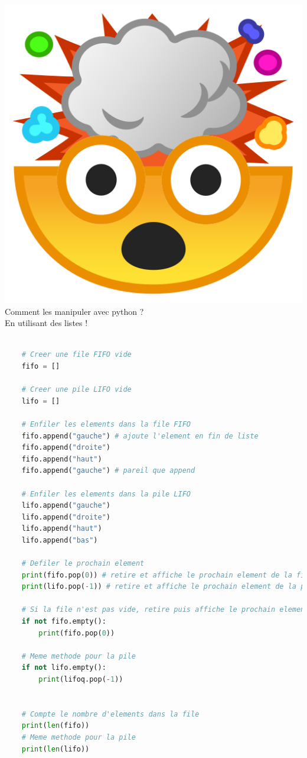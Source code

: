 \documentclass{report}
\begin{document}
\includegraphics[scale=0.03]{mindblow}{\selectfont
Comment les manipuler avec python ?
}\\[0.5cm]
En utilisant des listes !
\begin{lstlisting}[language=Python]

    # Creer une file FIFO vide 
    fifo = []

    # Creer une pile LIFO vide 
    lifo = []
    
    # Enfiler les elements dans la file FIFO
    fifo.append("gauche") # ajoute l'element en fin de liste
    fifo.append("droite")
    fifo.append("haut")
    fifo.append("gauche") # pareil que append

    # Enfiler les elements dans la pile LIFO
    lifo.append("gauche")
    lifo.append("droite")
    lifo.append("haut")
    lifo.append("bas") 

    # Defiler le prochain element
    print(fifo.pop(0)) # retire et affiche le prochain element de la file
    print(lifo.pop(-1)) # retire et affiche le prochain element de la pile

    # Si la file n'est pas vide, retire puis affiche le prochain element
    if not fifo.empty():
        print(fifo.pop(0)) 

    # Meme methode pour la pile
    if not lifo.empty():
        print(lifoq.pop(-1)) 


    # Compte le nombre d'elements dans la file
    print(len(fifo))
    # Meme methode pour la pile
    print(len(lifo))

\end{lstlisting}
\end{document}
